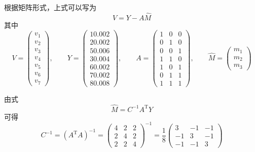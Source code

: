 \documentclass[UTF8,zihao=-4]{ctexart}
\begin{document}
根据矩阵形式，上式可以写为
\begin{equation*}
    V=Y-A\hat{M}
\end{equation*}
其中
\begin{equation*}
    V=
    \begin{pmatrix}
        v_1\\
        v_2\\
        v_3\\
        v_4\\
        v_5\\
        v_6\\
        v_7
    \end{pmatrix},
    \qquad
    Y=
    \begin{pmatrix}
        10.002\\
        20.002\\
        50.006\\
        30.004\\
        60.002\\
        70.002\\
        80.008
    \end{pmatrix},
    \qquad
    A=
    \begin{pmatrix}
        1 & 0 & 0\\
        0 & 1 & 0\\
        0 & 0 & 1\\
        1 & 1 & 0\\
        1 & 0 & 1\\
        0 & 1 & 1\\
        1 & 1 & 1
    \end{pmatrix},
    \qquad
    \hat{M}=
    \begin{pmatrix}
        m_1\\
        m_2\\
        m_3
    \end{pmatrix}
\end{equation*}

由式
\begin{equation*}
    \hat{M}=C^{-1}A^{\mathrm{T}}Y
\end{equation*}
可得
\begin{equation*}
    C^{-1}
    =
    (A^{\mathrm{T}}A)^{-1}
    =
    \begin{pmatrix}
        4 & 2 & 2\\
        2 & 4 & 2\\
        2 & 2 & 4
    \end{pmatrix}^{-1}
    =
    \frac{1}{8}
    \begin{pmatrix}
        3 & -1 & -1\\
        -1 & 3 & -1\\
        -1 & -1 & 3
    \end{pmatrix}
\end{equation*}
\end{document}
